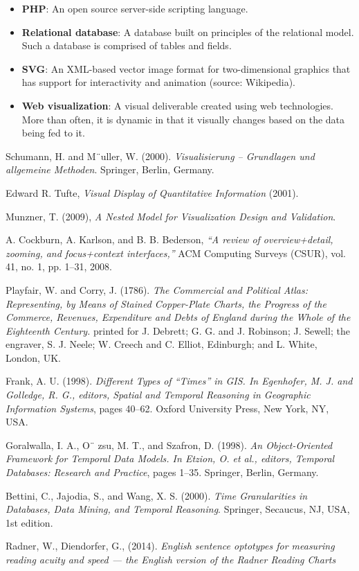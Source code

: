 \documentclass[12pt]{article}
\begin{document}
\begin{itemize}
\item[] \textbf{PHP}: An open source server-side scripting language.
\item[] \textbf{Relational database}: A database built on principles of the relational model. Such a database is comprised of tables and fields.
\item[] \textbf{SVG}: An XML-based vector image format for two-dimensional graphics that has support for interactivity and animation (source: Wikipedia).
\item[] \textbf{Web visualization}: A visual deliverable created using web technologies. More than often, it is dynamic in that it visually changes based on the data being fed to it. 
\end{itemize}

\vfill

\begin{thebibliography}{1}

   Schumann, H. and M¨uller, W. (2000). {\em Visualisierung – Grundlagen und allgemeine Methoden}. Springer, Berlin, Germany.

    Edward R. Tufte, {\em Visual Display of Quantitative Information} (2001).

   Munzner, T. (2009), {\em A Nested Model for Visualization Design and Validation}.

   A. Cockburn, A. Karlson, and B. B. Bederson, {\em “A review of overview+detail, zooming, and focus+context interfaces,”} ACM Computing Surveys (CSUR), vol. 41, no. 1, pp. 1–31, 2008.
  
   Playfair, W. and Corry, J. (1786). {\em The Commercial and Political Atlas: Representing, by Means of Stained Copper-Plate Charts, the Progress of the Commerce, Revenues, Expenditure and Debts of England during the Whole of the Eighteenth Century.} printed for J. Debrett; G. G. and J. Robinson; J. Sewell; the engraver, S. J. Neele; W. Creech and C. Elliot, Edinburgh; and L. White, London, UK.
  
   Frank, A. U. (1998). {\em Different Types of “Times” in GIS. In Egenhofer, M. J. and Golledge, R. G., editors, Spatial and Temporal Reasoning in Geographic Information Systems}, pages 40–62. Oxford University Press, New York, NY, USA.
  
   Goralwalla, I. A., O¨ zsu, M. T., and Szafron, D. (1998). {\em An Object-Oriented Framework for Temporal Data Models. In Etzion, O. et al., editors, Temporal Databases: Research and Practice}, pages 1–35. Springer, Berlin, Germany.
  
   Bettini, C., Jajodia, S., and Wang, X. S. (2000). {\em Time Granularities in Databases, Data Mining, and Temporal Reasoning}. Springer, Secaucus, NJ, USA, 1st edition.

   Radner, W., Diendorfer, G., (2014). {\em English sentence optotypes for measuring reading acuity and speed --- the English version of the Radner Reading Charts}

  \end{thebibliography}
\end{document}
